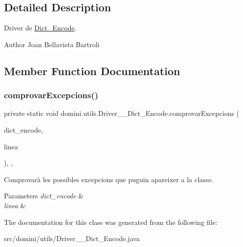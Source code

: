 \subsection{Detailed Description}
Driver de \hyperlink{classdomini_1_1utils_1_1Dict__Encode}{Dict\+\_\+\+Encode}. 

\begin{DoxyAuthor}{Author}
Joan Bellavista Bartroli 
\end{DoxyAuthor}


\subsection{Member Function Documentation}
\mbox{\label{classdomini_1_1utils_1_1Driver____Dict__Encode_ab67e87f26a75c12e50130a5e5facb52e}} 
\subsubsection{\texorpdfstring{comprovar\+Excepcions()}{comprovarExcepcions()}}
{\footnotesize\ttfamily private static void domini.\+utils.\+Driver\+\_\+\+\_\+\+Dict\+\_\+\+Encode.\+comprovar\+Excepcions (\begin{DoxyParamCaption}\item[{\hyperlink{classdomini_1_1utils_1_1Dict__Encode}{Dict\+\_\+\+Encode}}]{dict\+\_\+encode,  }\item[{String}]{linea }\end{DoxyParamCaption})\hspace{0.3cm}{\ttfamily [inline]}, {\ttfamily [static]}, {\ttfamily [private]}}



Comprovarà les possibles excepcions que puguin apareixer a la classe. 


\begin{DoxyParams}{Parameters}
{\em dict\+\_\+encode} & \\
\hline
{\em linea} & \\
\hline
\end{DoxyParams}


The documentation for this class was generated from the following file\+:\begin{DoxyCompactItemize}
\item 
src/domini/utils/Driver\+\_\+\+\_\+\+Dict\+\_\+\+Encode.\+java\end{DoxyCompactItemize}
